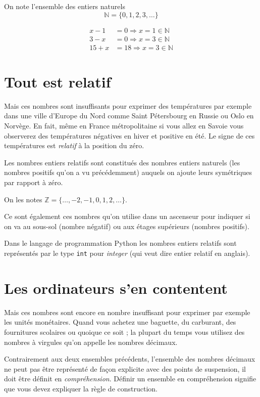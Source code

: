 \documentclass[a4paper, 11pt, twoside]{book}
\newcommand{\N}{\mathbb{N}}
\newcommand{\Z}{\mathbb{Z}}
\begin{document}
On note l'ensemble des entiers naturels \[\N = \{0, 1, 2, 3,\dots
   \}\]


\begin{align*}
x - 1 &= 0 \Rightarrow x = 1\in\N\\
3 - x &= 0 \Rightarrow x = 3\in\N\\
15 + x&= 18\Rightarrow x = 3\in\N
\end{align*}

\section{Tout est relatif}
\label{sec:org5dbd163}

Mais ces nombres sont insuffisants pour exprimer des températures
par exemple dans une ville d'Europe du Nord comme Saint Pétersbourg
en Russie ou Oslo en Norvège. En fait, même en France
métropolitaine si vous allez en Savoie vous observerez des
températures négatives en hiver et positive en été. Le signe de ces
températures est \emph{relatif} à la position du zéro.

Les nombres entiers relatifs sont constitués des nombres entiers
naturels (les nombres positifs qu'on a vu précédemment) auquels on
ajoute leurs symétriques par rapport à zéro.

On les notes \(\Z = \{\dots, -2, -1, 0, 1, 2, \dots\}\).

Ce sont également ces nombres qu'on utilise dans un ascenseur pour
indiquer si on va au sous-sol (nombre négatif) ou aux étages
supérieurs (nombres positifs).

Dans le langage de programmation Python les nombres entiers
relatifs sont représentés par le type \texttt{int} pour \emph{integer} (qui
veut dire entier relatif en anglais).

\section{Les ordinateurs s'en contentent}
\label{sec:org393595a}

Mais ces nombres sont encore en nombre insuffisant pour exprimer
par exemple les unités monétaires. Quand vous achetez une baguette,
du carburant, des fournitures scolaires ou quoique ce soit ; la
plupart du temps vous utilisez des nombres à virgules qu'on appelle
les nombres décimaux.

Contrairement aux deux ensembles précédents, l'ensemble des nombres
décimaux ne peut pas être représenté de façon explicite avec des
points de suspension, il doit être définit en
\emph{compréhension}. Définir un ensemble en compréhension signifie que
vous devez expliquer la règle de construction.
\end{document}

